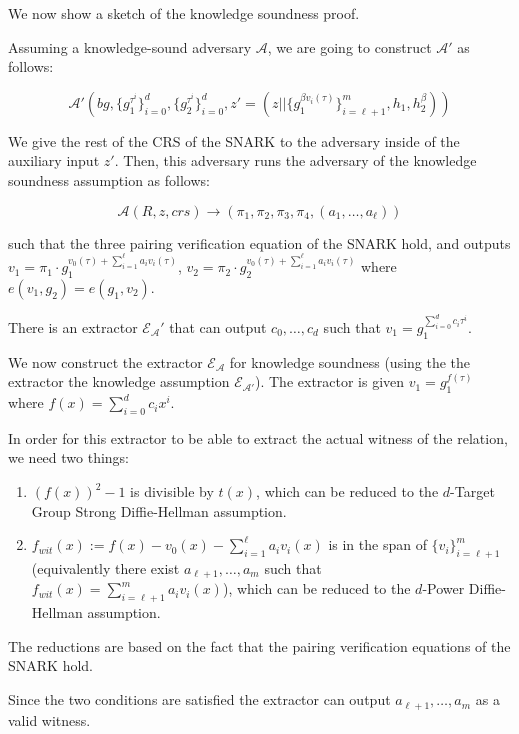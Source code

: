 We now show a sketch of the knowledge soundness proof.

Assuming a knowledge-sound adversary $\mathcal{A}$, we are going to construct $\mathcal{A}'$ as follows:

$$\mathcal{A}'(bg, \{g_1^{\tau^i}\}_{i=0}^d, \{g_2^{\tau^i}\}_{i=0}^d, z' = (z || \{g_1^{\beta v_i(\tau)}\}_{i=\ell+1}^m, h_1, h_2^\beta))$$

We give the rest of the CRS of the SNARK to the adversary inside of the auxiliary input $z'$. Then, this adversary runs the adversary of the knowledge soundness assumption as follows:

$$\mathcal{A}(R, z, crs) \rightarrow (\pi_1, \pi_2, \pi_3, \pi_4, (a_1, \dots, a_\ell))$$

such that the three pairing verification equation of the SNARK hold, and outputs $v_1 = \pi_1 \cdot g_1^{v_0(\tau) + \sum_{i=1}^\ell a_i v_i(\tau)}$, $v_2 = \pi_2 \cdot g_2^{v_0(\tau) + \sum_{i=1}^\ell a_i v_i(\tau)}$ where $e(v_1, g_2) = e(g_1, v_2)$. 

There is an extractor $\mathcal{E}_\mathcal{A}'$ that can output $c_0, \dots, c_d$ such that $v_1 = g_1^{\sum_{i=0}^d c_i \tau^i}$.

We now construct the extractor $\mathcal{E}_\mathcal{A}$ for knowledge soundness (using the the extractor the knowledge assumption $\mathcal{E}_{\mathcal{A}'}$). The extractor is given $v_1 = g_1^{f(\tau)}$ where $f(x) = \sum_{i=0}^d c_i x^i$.

In order for this extractor to be able to extract the actual witness of the relation, we need two things:
\begin{enumerate}
    \item $(f(x))^2 - 1$ is divisible by $t(x)$, which can be reduced to the $d$-Target Group Strong Diffie-Hellman assumption.
    \item $f_{wit}(x) := f(x) - v_0(x) - \sum_{i=1}^\ell a_i v_i(x)$ is in the span of $\{v_i\}_{i=\ell+1}^m$ (equivalently there exist $a_{\ell+1}, \dots, a_m$ such that $f_{wit}(x) = \sum_{i=\ell+1}^m a_i v_i(x)$), which can be reduced to the $d$-Power Diffie-Hellman assumption.
\end{enumerate}
The reductions are based on the fact that the pairing verification equations of the SNARK hold.

Since the two conditions are satisfied the extractor can output $a_{\ell+1}, \dots, a_m$ as a valid witness.


